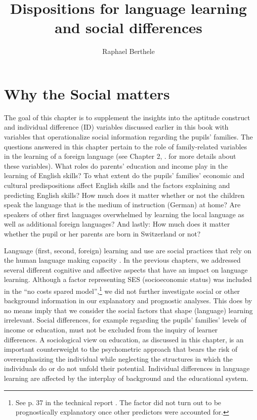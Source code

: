 \documentclass[output=paper]{langsci/langscibook}
\author{Raphael Berthele\affiliation{University of Fribourg, Institut de Plurilinguisme}\orcid{}}
\title{Dispositions for language learning and social differences}
\begin{document}
\maketitle 


\section{Why the Social matters}

The goal of this chapter is to supplement the insights into the aptitude construct and individual difference (ID) variables discussed earlier in this book with variables that operationalize social information regarding the pupils’ families. The questions answered in this chapter pertain to the role of family-related variables in the learning of a foreign language (see Chapter 2, . for more details about these variables). What roles do parents’ education and income play in the learning of English skills? To what extent do the pupils' families' economic and cultural predispositions affect English skills and the factors explaining and predicting English skills? How much does it matter whether or not the children speak the language that is the medium of instruction (German) at home? Are speakers of other first languages overwhelmed by learning the local language as well as additional foreign languages? And lastly: How much does it matter whether the pupil or her parents are born in Switzerland or not?

Language (first, second, foreign) learning and use are social practices that rely on the human language making capacity \citep{Slobin1985}. In the previous chapters, we addressed several different cognitive and affective aspects that have an impact on language learning. Although a factor representing SES (socioeconomic status) was included in the ``no costs spared model'',\footnote{See p. 37 in the technical report \citep{Vanhove2021}. The factor did not turn out to be prognostically explanatory once other predictors were accounted for.} we did not further investigate social or other background information in our explanatory and prognostic analyses. This does by no means imply that we consider the social factors that shape (language) learning irrelevant. Social differences, for example regarding the pupils’ families’ levels of income or education, must not be excluded from the inquiry of learner differences. A sociological view on education, as discussed in this chapter, is an important counterweight to the psychometric approach that bears the risk of overemphasizing the individual while neglecting the structures in which the individuals do or do not unfold their potential. Individual differences in language learning are affected by the interplay of background and the educational system. 
\end{document}
